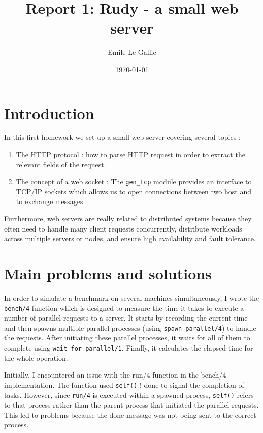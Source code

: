 \documentclass[a4paper, 11pt]{article}
\title{Report 1: Rudy - a small web server}
\author{Emile Le Gallic}
\date{\today{}}
\begin{document}
\maketitle

\section{Introduction}

In this first homework we set up a small web server covering several topics :
\begin{enumerate}

    \item The HTTP protocol : how to parse HTTP request in order to extract the relevant fields of the request.
    \item The concept of a web socket : The \texttt{gen\_tcp} module provides an interface to TCP/IP sockets which allows us to open connections between two host and to exchange messages.  
\end{enumerate}

Furthermore, web servers are really related to distributed systems because they often need to handle many client requests concurrently, distribute workloads across multiple servers or nodes, and ensure high availability and fault tolerance. 


\section{Main problems and solutions}

In order to simulate a benchmark on several machines simultaneously, I wrote the \texttt{bench/4} function which is designed to measure the time it takes to execute a number of parallel requests to a server. It starts by recording the current time and then spawns multiple parallel processes (using \texttt{spawn\_parallel/4}) to handle the requests. After initiating these parallel processes, it waits for all of them to complete using \texttt{wait\_for\_parallel/1}. Finally, it calculates the elapsed time for the whole operation.

\hfill 

Initially, I encountered an issue with the run/4 function in the bench/4 implementation. The function used \texttt{self()} ! done to signal the completion of tasks. However, since \texttt{run/4} is executed within a spawned process, \texttt{self()} refers to that process rather than the parent process that initiated the parallel requests. This led to problems because the done message was not being sent to the correct process.
\end{document}

